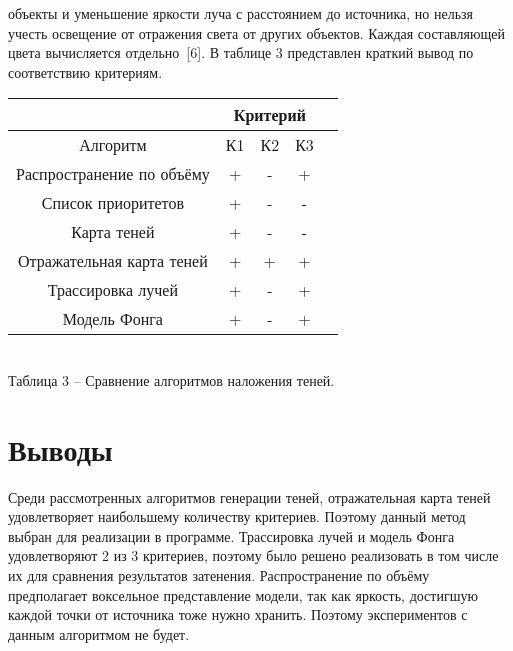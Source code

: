 {{        объекты и уменьшение яркости луча с расстоянием до источника,
        но нельзя учесть освещение от отражения света от других объектов.
        Каждая составляющей цвета вычисляется отдельно~[6].
    }
    В таблице 3 представлен краткий вывод по соответствию критериям.
    \begin{center}
        \begin{tabular} { |c|c|c|c|c| }
            \hline
            \hspace{0pt} & \multicolumn{3}{|c|}{Критерий} \\
            \hline
            Алгоритм & К1 & К2 & К3 \\
            \hline
            Распространение по объёму & + & - & + \\
            \hline
            Список приоритетов & + & - & -  \\
            \hline
            Карта теней & + & - & - \\
            \hline
            Отражательная карта теней & + & + & + \\
            \hline
            Трассировка лучей & + & - & + \\
            \hline
            Модель Фонга & + & - & + \\
            \hline
        \end{tabular}
        \\
        \vspace{2mm}
        \small { Таблица 3 -- Сравнение алгоритмов наложения теней. }
    \end{center}
    
    \section*{Выводы} {
        Среди рассмотренных алгоритмов генерации теней, отражательная карта теней
        удовлетворяет наибольшему количеству критериев.
        Поэтому данный метод выбран для реализации в программе.
        Трассировка лучей и модель Фонга удовлетворяют 2 из 3 критериев, поэтому
        было решено реализовать в том числе их для сравнения результатов
        затенения.
        Распространение по объёму предполагает воксельное представление модели,
        так как яркость, достигшую каждой точки от источника тоже нужно хранить.
        Поэтому экспериментов с данным алгоритмом не будет.
    }
}